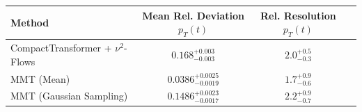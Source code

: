     \begin{tabular}{lccc}
        \toprule
        Method & Mean Rel. Deviation $p_{T}(t)$ & Rel. Resolution $p_{T}(t)$ \\
        \midrule
        CompactTransformer + $\nu^2$-Flows & $0.168^{+0.003}_{-0.003}$ & $2.0^{+0.5}_{-0.3}$ \\
        MMT (Mean) & $0.0386^{+0.0025}_{-0.0019}$ & $1.7^{+0.9}_{-0.6}$ \\
        MMT (Gaussian Sampling) & $0.1486^{+0.0023}_{-0.0017}$ & $2.2^{+0.9}_{-0.7}$ \\
        \bottomrule
    \end{tabular}